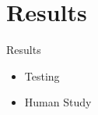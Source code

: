 \section{Results}
\begin{frame}{Results}
    \begin{itemize}
        \item Testing
        \item Human Study
    \end{itemize}
\end{frame}



